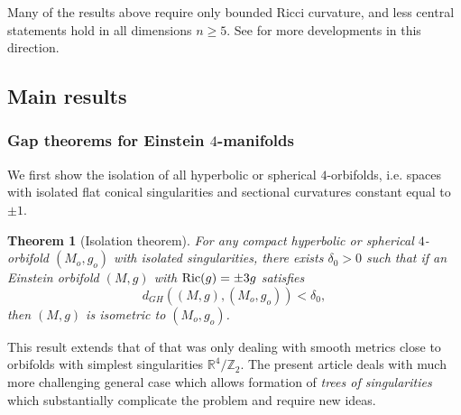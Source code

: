 \documentclass[11pt,reqno]{amsart}
\numberwithin{equation}{section}
\newcommand{\Ric}{{\rm Ric}}
\newcommand{\cR}{\mathcal{R}}
\newcommand{\cS}{\mathcal{S}}
\newtheorem{theorem}[thm]{Theorem}
\theoremstyle{definition}
\theoremstyle{remark}
\begin{document}
\begin{enumerate}
\end{enumerate}


Many of the results above
require only bounded Ricci curvature, and less central statements hold in all dimensions $n\geqslant 5$. See \cite{col96a,col96b, cct, ct06,col12, chn13,bam17,bam18,bam20} for more developments in this direction.





\subsection{Main results}




\subsubsection{Gap theorems for Einstein $4$-manifolds}

We first show the isolation of all hyperbolic or spherical $4$-orbifolds, i.e. spaces with isolated flat conical singularities and sectional curvatures constant equal to $\pm1$.

\begin{theorem}[Isolation theorem]\label{thm:isolation orbifolds}
    For any compact hyperbolic or spherical $4$-\emph{orbifold} $(M_o,g_o)$ with isolated singularities, there exists $\delta_0 >0$ such that if an Einstein \emph{orbifold} $(M,g)$ with $ \Ric(g) = \pm 3g$ satisfies
    $$ d_{GH}\left((M,g),(M_o,g_o)\right) < \delta_0,$$
    then $(M,g)$ is \emph{isometric} to $(M_o,g_o)$.
\end{theorem}

This result extends that of \cite{ozu4} that was only dealing with smooth metrics close to orbifolds with simplest singularities $\mathbb{R}^4/\mathbb{Z}_2$. The present article deals with much more challenging general case which allows formation of \textit{trees of singularities} which substantially complicate the problem and require new ideas.
\end{document}
